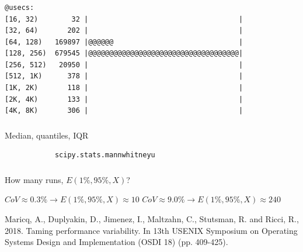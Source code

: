\documentclass[usenames,dvipsnames, 18pt, compress, aspectratio=169]{beamer}
\begin{document}
\begin{frame}[fragile]{}
    \frametitle{}
    \begin{center}
        \begin{verbatim}
@usecs:
[16, 32)        32 |                                    |
[32, 64)       202 |                                    |
[64, 128)   169897 |@@@@@@                              |
[128, 256)  679545 |@@@@@@@@@@@@@@@@@@@@@@@@@@@@@@@@@@@@|
[256, 512)   20950 |                                    |
[512, 1K)      378 |                                    |
[1K, 2K)       118 |                                    |
[2K, 4K)       133 |                                    |
[4K, 8K)       306 |                                    |
        \end{verbatim}

    \end{center}
\end{frame}

\begin{frame}[fragile]{}
    \frametitle{}
    \begin{center}

    Median, quantiles, IQR

    \begin{verbatim}
            scipy.stats.mannwhitneyu
    \end{verbatim}
    \end{center}
\end{frame}

\begin{frame}
    \frametitle{}
    \begin{center}
        How many runs, $E(1\%, 95\%, X)$?

        $CoV \approx 0.3 \% \to E(1\%, 95\%, X) \approx 10$
        $CoV \approx 9.0 \% \to E(1\%, 95\%, X) \approx 240$

    \linespread{0.5}
    \vspace{0.5cm}
    \color{black}\fontsize{6pt}{0}\selectfont
        Maricq, A., Duplyakin, D., Jimenez, I., Maltzahn, C., Stutsman, R. and
        Ricci, R., 2018. Taming performance variability. In 13th {USENIX}
        Symposium on Operating Systems Design and Implementation ({OSDI} 18)
        (pp. 409-425).
    \linespread{1.5}

    \end{center}
\end{frame}
\end{document}
